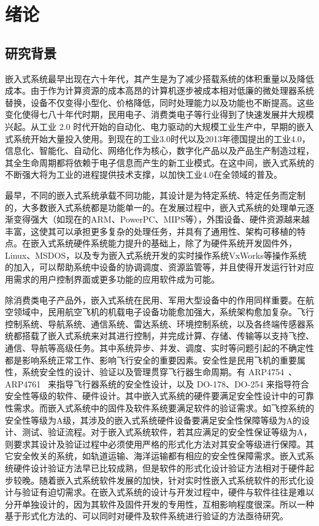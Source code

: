 \chapter{绪论}
\label{cha:intro}

\section{研究背景}


嵌入式系统最早出现在六十年代，其产生是为了减少搭载系统的体积重量以及降低成本。由于作为计算资源的成本高昂的计算机逐步被成本相对低廉的微处理器系统替换，设备不仅变得小型化、价格降低，同时处理能力以及功能也不断提高。这些变化使得七八十年代时期，民用电子、消费类电子等行业得到了快速发展并大规模兴起。从工业 2.0 时代开始的自动化、电力驱动的大规模工业生产中，早期的嵌入式系统开始大量投入使用。到现在的工业3.0时代以及2013年德国提出的工业4.0，信息化、智能化、自动化、网络化作为核心，数字化产品以及产品生产制造过程，其全生命周期都将依赖于电子信息而产生的新工业模式。在这中间，嵌入式系统的不断强大将为工业的进程提供技术支撑，以加快工业4.0在全领域的普及。

最早，不同的嵌入式系统承载不同功能，其设计是为特定系统、特定任务而定制的，大多数嵌入式系统都是功能单一的。在发展过程中，嵌入式系统的处理单元逐渐变得强大（如现在的ARM、PowerPC、MIPS等），外围设备、硬件资源越来越丰富，这使其可以承担更多复杂的处理任务，并具有了通用性、架构可移植的特点。在嵌入式系统硬件系统能力提升的基础上，除了为硬件系统开发固件外，Linux、MSDOS，以及专为嵌入式系统开发的实时操作系统VxWorks等操作系统的加入，可以帮助系统中设备的协调调度、资源监管等，并且使得开发运行针对应用需求的用户控制界面或更多功能的应用软件成为可能。 

除消费类电子产品外，嵌入式系统在民用、军用大型设备中的作用同样重要。在航空领域中，民用航空飞机的机载电子设备功能愈加强大，系统架构愈加复杂。飞行控制系统、导航系统、通信系统、雷达系统、环境控制系统，以及各终端传感器系统都搭载了嵌入式系统来对其进行控制，并完成计算、存储、传输等以支持飞控、通信、导航等高级任务。其中系统异步、并发、调度、实时等问题引起的不确定性都是影响系统正常工作、影响飞行安全的重要因素。安全性是民用飞机的重要属性，系统安全性的设计、验证以及管理贯穿飞行器生命周期。有 ARP4754~\cite{ARP4754A}、ARP4761~\cite{ARP4761} 来指导飞行器系统的安全性设计，以及 DO-178、DO-254 来指导符合安全性等级的软件、硬件设计。其中嵌入式系统的硬件要满足安全性设计中的可靠性需求。而嵌入式系统中的固件及软件系统要满足软件的验证需求。如飞控系统的安全性等级为A级，其涉及的嵌入式系统硬件设备要满足安全性保障等级为A的设计、测试、验证流程。对于嵌入式系统软件，若其应满足的安全性保证等级为A，则要求其设计及验证过程中必须使用严格的形式化方法对其安全等级进行保障。其它安全攸关的系统，如轨道运输、海洋运输都有相应的安全性保障需求。嵌入式系统硬件设计验证方法早已比较成熟，但是软件的形式化设计验证方法相对于硬件起步较晚。随着嵌入式系统软件发展的加快，针对实时性嵌入式系统软件的形式化设计与验证有迫切需求。在嵌入式系统的设计与开发过程中，硬件与软件往往是难以分开单独设计的，因为其软件及固件开发的专用性，互相影响程度很深。所以一种基于形式化方法的、可以同时对硬件及软件系统进行验证的方法亟待研究。



